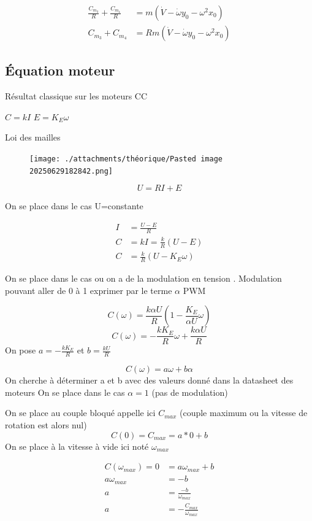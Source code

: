 \documentclass[a4paper,12pt]{report}  %
\begin{document}
\begin{align}
	\frac{C_{m_3}}{R} + \frac{C_{m_4}}{R} &= m(\dot{V} - \dot{\omega} y_0 - \omega^2 x_0) \\
	C_{m_3} + C_{m_4} &= Rm(\dot{V} - \dot{\omega} y_0 - \omega^2 x_0)
\end{align}



\subsection{Équation moteur} 
Résultat classique sur les moteurs CC

$C = kI$      $E=K_{E}\omega$

Loi des mailles 
\begin{figure}[H]
	\centering
	\texttt{[image: ./attachments/théorique/Pasted image 20250629182842.png]}
	\caption{}
\end{figure}


$$
U = RI + E
$$

On se place dans le cas U=constante




\begin{align}	
	I &= \frac{U-E}{R} \\
	C &= kI = \frac{k}{R}(U-E) \\
	C &= \frac{k}{R}(U-K_{E}\omega)
\end{align}






On se place dans le cas ou on a de la modulation en tension . Modulation pouvant aller de 0 à 1 exprimer par le terme $\alpha$ PWM



$$
C(\omega) = \frac{k \alpha U}{R} (1 - \frac{K_E}{\alpha U} \omega)
$$
$$
C(\omega) = - \frac{k K_E}{R} \omega + \frac{k \alpha U}{R} 
$$
On pose $a =- \frac{k K_E}{R}$ et $b=\frac{k  U}{R}$ 

$$
C(\omega) = a\omega + b\alpha 
$$
On cherche à déterminer a et b avec des valeurs donné dans la datasheet des moteurs
On se place dans le cas $\alpha = 1$ (pas de modulation)

On se place au couple bloqué appelle ici $C_{max}$ (couple maximum ou la vitesse de rotation est alors nul)
$$
C(0) = C_{max} = a*0 + b
$$
On se place à la vitesse à vide ici noté $\omega_{max}$ 

\begin{align}
	C(\omega_{max}) = 0 &= a\omega_{max} + b \\
	a\omega_{max} &= -b \\
	a &= \frac{-b}{\omega_{max}} \\
	a &= -\frac{C_{max}}{\omega_{max}}
\end{align}
\end{document}
